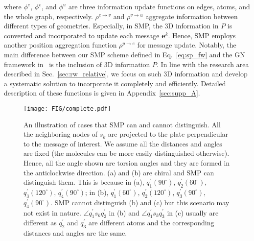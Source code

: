 \documentclass{article}
\begin{document}
where $\phi^e$, $\phi^v$, and $\phi^u$ are three information update functions on edges, atoms, and the whole graph, respectively.
$\rho^{e\rightarrow v}$ and $\rho^{v\rightarrow u}$ aggregate information between different types of geometries.
Especially, in SMP, the 3D information in $P$ is converted and incorporated to
update each message $\mathbf{e}^k$. Hence,
SMP employs another position 
aggregation function $\rho^{p\rightarrow e}$ for message update.
\textcolor{COLOR}{Notably, the main difference between our SMP scheme
defined in Eq.~\ref{eq:sp_fw} and the GN framework in~\cite{battaglia2018relational} is the inclusion of 3D information $P$. In line with the research area described in Sec.~\ref{sec:rw_relative},
we focus on such 3D information and develop a systematic solution to incorporate it
completely and efficiently.}
Detailed description of these functions is given in Appendix~\ref{sec:supp_A}.

\begin{wrapfigure}[21]{r}{0.7\textwidth}\vspace{-0.4 cm}
    \texttt{[image: FIG/complete.pdf]}
    \caption{An illustration of cases that SMP can and cannot distinguish.
    All the neighboring nodes of $s_k$ are projected to the plate perpendicular to
    the message of interest. We assume all the distances and angles are fixed (the molecules can be more 
    easily distinguished otherwise).
    Hence, all the angle shown are torsion angles and
    they are formed in the anticlockwise direction.
    (a) and (b) are chiral and SMP can distinguish them. This is because in (a),
    $q^\prime_1(90^\circ)$, $q^\prime_2(60^\circ)$, $q^\prime_3(120^\circ)$,
    $q^\prime_4(90^\circ)$; in (b),
    $q^\prime_1(60^\circ)$, $q^\prime_2(120^\circ)$, $q^\prime_3(90^\circ)$,
    $q^\prime_4(90^\circ)$.
    SMP cannot distinguish (b) and (c) but this scenario may not exist in nature.
    $\angle q^\prime_1s_kq^\prime_2$ in (b) and $\angle q^\prime_1s_kq^\prime_3$ in (c)
    usually are different as $q^\prime_2$ and $q^\prime_3$ are different atoms and the corresponding
    distances and angles are the same.
    }\label{fig:complete}
    \vspace{-10 pt}
\end{wrapfigure}
\end{document}
